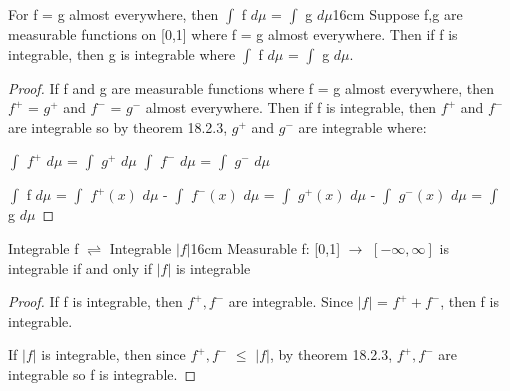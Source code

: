     \vspace{0.5cm}



    \begin{wtheorem}{For f = g almost everywhere,
    then $\int$ f $d\mu$ = $\int$ g $d\mu$}{16cm}
        Suppose f,g are measurable functions on [0,1]
        where f = g almost everywhere. Then if f is integrable, then
        g is integrable where $\int$ f $d\mu$ = $\int$ g $d\mu$.
    \end{wtheorem}

    \begin{proof}
        If f and g are measurable functions where f = g almost everywhere,
        then $f^+$ = $g^+$ and $f^-$ = $g^-$ almost everywhere.
        Then if f is integrable, then $f^+$ and $f^-$ are integrable
        so by {\color{red} theorem 18.2.3}, $g^+$ and $g^-$ are integrable
        where:
        
        \hspace{0.5cm}
        $\int$ $f^+$ $d\mu$ = $\int$ $g^+$ $d\mu$
        \hspace{1cm}
        $\int$ $f^-$ $d\mu$ = $\int$ $g^-$ $d\mu$

        \hspace{0.5cm}
        $\int$ f $d\mu$
        = $\int$ $f^+(x)$ $d\mu$ - $\int$ $f^-(x)$ $d\mu$
        = $\int$ $g^+(x)$ $d\mu$ - $\int$ $g^-(x)$ $d\mu$
        = $\int$ g $d\mu$
    \end{proof}

    \vspace{0.5cm}



    \begin{wtheorem}{Integrable f $\rightleftharpoons$ Integrable $|f|$}{16cm}
        Measurable f: [0,1] $\rightarrow$ $[-\infty,\infty]$
        is integrable if and only if $|f|$ is integrable
    \end{wtheorem}

    \begin{proof}
        If f is integrable, then $f^+,f^-$
        are integrable. Since $|f|$ = $f^+ + f^-$, then f is integrable.

        If $|f|$ is integrable, then since $f^+,f^-$ $\leq$ $|f|$,
        by {\color{red} theorem 18.2.3}, $f^+,f^-$ are integrable
        so f is integrable.
    \end{proof}

    \vspace{0.5cm}



